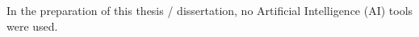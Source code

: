
\indent In the preparation of this thesis / dissertation, no Artificial
Intelligence (AI) tools were used.

%

